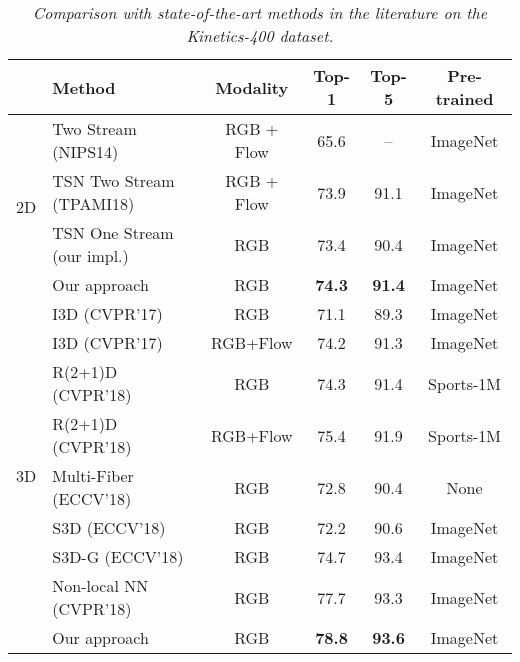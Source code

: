 \documentclass[10pt,twocolumn,letterpaper]{article}
\begin{document}
\begin{table*}
\begin{center}
\begin{tabular}{|c|l|c|c|c|c|}
\cline{2-6}
\multicolumn{1}{c|}{} & Method & Modality & Top-1 & Top-5 & Pre-trained \\
\hline
\multirow{4}{*}{2D} & Two Stream (NIPS14) \cite{TwoStream_NIPS14}             & RGB + Flow & 65.6& -- & ImageNet \\ & TSN Two Stream (TPAMI18) \cite{TSN_TPAMI18}           & RGB + Flow & 73.9        & 91.1          & ImageNet \\
& TSN One Stream (our impl.)                                           & RGB            & 73.4      & 90.4        & ImageNet \\\cline{2-6}
& \cellcolor[gray]{0.9}Our approach                                                                          & \cellcolor[gray]{0.9}RGB            & \cellcolor[gray]{0.9}\bf 74.3      & \cellcolor[gray]{0.9}\bf 91.4        & \cellcolor[gray]{0.9}ImageNet \\

\hline
\multirow{9}{*}{3D} & I3D (CVPR'17) \cite{Inflated3D_CVPR17}                & RGB           & 71.1 & 89.3 & ImageNet \\
& I3D (CVPR'17) \cite{Inflated3D_CVPR17}                & RGB+Flow  & 74.2 & 91.3 & ImageNet \\
& R(2+1)D (CVPR'18) \cite{R2plus1d_CVPR18}           & RGB          & 74.3 & 91.4 & Sports-1M\\
& R(2+1)D (CVPR'18) \cite{R2plus1d_CVPR18}           & RGB+Flow & 75.4 & 91.9 & Sports-1M\\
& Multi-Fiber (ECCV'18) \cite{Multifiber_ECCV18}        & RGB           & 72.8 & 90.4 & None \\
& S3D (ECCV'18) \cite{S3D_G_ECCV18}                     & RGB          & 72.2 & 90.6 & ImageNet \\
& S3D-G (ECCV'18) \cite{S3D_G_ECCV18}                  & RGB          & 74.7 & 93.4 & ImageNet\\
& Non-local NN (CVPR'18) \cite{NonLocalNN_CVPR18} & RGB          & 77.7 & 93.3 & ImageNet \\\cline{2-6}
& \cellcolor[gray]{0.9}Our approach & \cellcolor[gray]{0.9}RGB & \cellcolor[gray]{0.9}\bf 78.8 & \cellcolor[gray]{0.9}\bf 93.6 & \cellcolor[gray]{0.9}ImageNet \\
\hline
\end{tabular}\vspace{-2mm}
\end{center}
\caption{\it Comparison with state-of-the-art methods in the literature on the Kinetics-400 dataset.\vspace{-2mm}}
\label{tab:sota_kinetics}
\end{table*}
\end{document}
